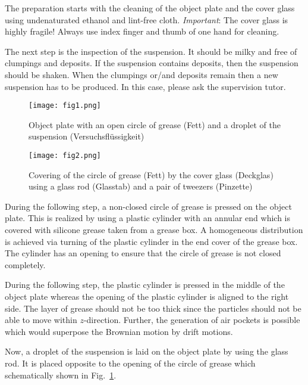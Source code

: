 \documentclass{tudphygp_eng}
\begin{document}
The preparation starts with the cleaning of the object plate and the cover glass using undenaturated ethanol and lint-free cloth. \emph{Important}: The cover glass is highly fragile! Always use index finger and thumb of one hand for cleaning.

The next step is the inspection of the suspension. It should be milky and free of clumpings and deposits. If the suspension contains deposits, then the suspension should be shaken. When the clumpings or/and deposits remain then a new suspension has to be produced. In this case, please ask the supervision tutor.

\begin{figure}[t]
\begin{center}
\texttt{[image: fig1.png]} 
\caption{Object plate with an open circle of grease (\grqq{}Fett\grqq{}) and a droplet of the suspension (\grqq{}Versuchsfl{\"u}ssigkeit\grqq{})}
\label{fig1}
\end{center}
\end{figure}

\begin{figure}[t]
\begin{center}
\texttt{[image: fig2.png]} 
\caption{Covering of the circle of grease (\grqq{}Fett\grqq{}) by the cover glass (\grqq{}Deckglas\grqq{}) using a glass rod (\grqq{}Glasstab\grqq{}) and a pair of tweezers (\grqq{}Pinzette\grqq{})}
\label{fig2}
\end{center}
\end{figure}

During the following step, a non-closed circle of grease is pressed on the object plate. This is realized by using a plastic cylinder with an annular end which is covered with silicone grease taken from a grease box. A homogeneous distribution is achieved via turning of the plastic cylinder in the end cover of the grease box. The cylinder has an opening to ensure that the circle of grease is not closed completely.

During the following step, the plastic cylinder is pressed in the middle of the object plate whereas the opening of the plastic cylinder is aligned to the right side. The layer of grease should not be too thick since the particles should not be able to move within $z$-direction. Further, the generation of air pockets is possible which would superpose the Brownian motion by drift motions.

Now, a droplet of the suspension is laid on the object plate by using the glass rod. It is placed opposite to the opening of the circle of grease which schematically shown in Fig.~\ref{fig1}.
\end{document}
